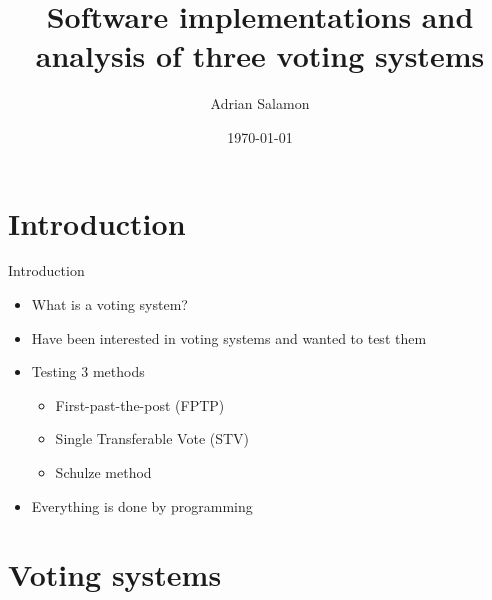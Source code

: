 \documentclass[xcolor=table]{beamer}
\title[Analysis of 3 voting systems]{Software implementations and analysis of three voting systems}
\author{Adrian Salamon}
\institute[Kungsholmens gymn.]{Kungsholmens gymnasium}
\date{\today}
\begin{document}
\begin{frame}
  \titlepage
\end{frame}

\section{Introduction}
\begin{frame}{Introduction}
\begin{itemize}
    \item What is a voting system?
    \item Have been interested in voting systems and wanted to test them
    \item Testing 3 methods
    \begin{itemize}
        \item First-past-the-post (FPTP)
        \item Single Transferable Vote (STV)
        \item Schulze method
    \end{itemize}
    \item Everything is done by programming
\end{itemize}
    
\end{frame}

\section{Voting systems}
\end{document}

